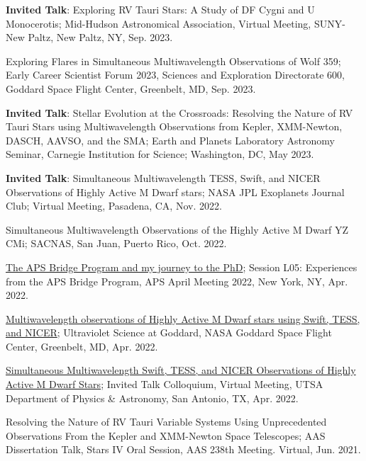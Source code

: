 \documentclass[letter,12pt]{article}
\begin{document}
\begin{etaremune}
\item \textbf{Invited Talk}: Exploring RV Tauri Stars: A Study of DF Cygni and U Monocerotis; Mid-Hudson Astronomical Association, Virtual Meeting, SUNY-New Paltz, New Paltz, NY, Sep. 2023.

\item Exploring Flares in Simultaneous Multiwavelength Observations of Wolf 359; Early Career Scientist Forum 2023, Sciences and Exploration Directorate 600, Goddard Space Flight Center, Greenbelt, MD, Sep. 2023.

\item \textbf{Invited Talk}: Stellar Evolution at the Crossroads: Resolving the Nature of RV Tauri Stars using Multiwavelength Observations from Kepler, XMM-Newton, DASCH, AAVSO, and the SMA; Earth and Planets Laboratory Astronomy Seminar, Carnegie Institution for Science; Washington, DC, May 2023.

\item \textbf{Invited Talk}: Simultaneous Multiwavelength TESS, Swift, and NICER Observations of Highly Active M Dwarf stars; NASA JPL Exoplanets Journal Club; Virtual Meeting, Pasadena, CA, Nov. 2022.

\item Simultaneous Multiwavelength Observations of the Highly Active M Dwarf YZ CMi; SACNAS, San Juan, Puerto Rico, Oct. 2022.

\item \href{https://meetings.aps.org/Meeting/APR22/Session/L05.1}{The APS Bridge Program and my journey to the PhD}; Session L05: Experiences from the APS Bridge Program, APS April Meeting 2022, New York, NY, Apr. 2022.

\item \href{https://asd.gsfc.nasa.gov/conferences/UVsymposium2022/agenda/}{Multiwavelength observations of Highly Active M Dwarf stars using Swift, TESS, and NICER}; Ultraviolet Science at Goddard, NASA Goddard Space Flight Center, Greenbelt, MD, Apr. 2022.

\item \href{https://twitter.com/UTSA_PhyAst/status/1508503792261779464?s=20&t=dVQ_0wPfIXmUPicaAi6VLg}{Simultaneous Multiwavelength Swift, TESS, and NICER Observations of Highly Active M Dwarf Stars}; Invited Talk Colloquium, Virtual Meeting, UTSA Department of Physics \& Astronomy, San Antonio, TX, Apr. 2022. 

\item Resolving the Nature of RV Tauri Variable Systems Using Unprecedented Observations From the Kepler and XMM-Newton Space Telescopes; AAS Dissertation Talk, Stars IV Oral Session, AAS 238th Meeting. Virtual, Jun. 2021.


\end{etaremune}
\end{document}
